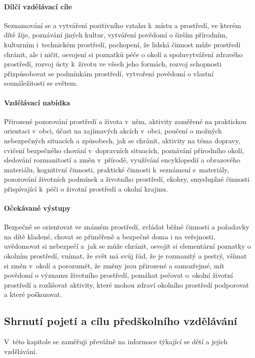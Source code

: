 				\paragraph{Dílčí vzdělávací cíle}
					Seznamování se a vytváření pozitivního vztahu k místu a prostředí, ve kterém dítě žije, poznávání jiných kultur, vytváření povědomí o širším přírodním, kulturním i technickém prostředí, pochopení, že lidská činnost může prostředí chránit, ale i ničit, osvojení si poznatků péče o okolí a spoluvytváření zdravého prostředí, rozvoj úcty k životu ve všech jeho formách, rozvoj schopnosti přizpůsobovat se podmínkám prostředí, vytvoření povědomí o vlastní sounáležitosti se světem.
				\paragraph{Vzdělávací nabídka}
					Přirozené pozorování prostředí a života v něm, aktivity zaměřené na praktickou orientaci v obci, účast na zajímavých akcích v obci, poučení o možných nebezpečných situacích a způsobech, jak se chránit, aktivity na téma dopravy, cvičení bezpečného chování v dopravních situacích, poznávání přírodního okolí, sledování rozmanitostí a změn v přírodě, využívání encyklopedií a obrazového materiálu, kognitivní činnosti, praktické činnosti k seznámení s materiály, pozorování životních podmínek a životního prostředí, ekohry, smysluplné činnosti přispívající k péči o životní prostředí a okolní krajinu.
				\paragraph{Očekávané výstupy}
					Bezpečně se orientovat ve známém prostředí, zvládat běžné činnosti a požadavky na dítě kladené, chovat se přiměřeně a bezpečně doma i na veřejnosti, uvědomovat si nebezpečí a jak se může chránit, osvojit si elementární poznatky o okolním prostředí, vnímat, že svět má svůj řád, že je rozmanitý a pestrý, všímat si změn v okolí a porozumět, že změny jsou přirozené a samozřejmé, mít povědomí o významu životního prostředí, pomáhat pečovat o okolní životní prostředí a rozlišovat aktivity, které mohou zdraví okolního prostředí podporovat a které poškozovat.

 			\subsection{Shrnutí pojetí a cílu předškolního vzdělávání}

				V této kapitole se zaměřuji převážně na informace týkající se dětí a jejich vzdělávání.

